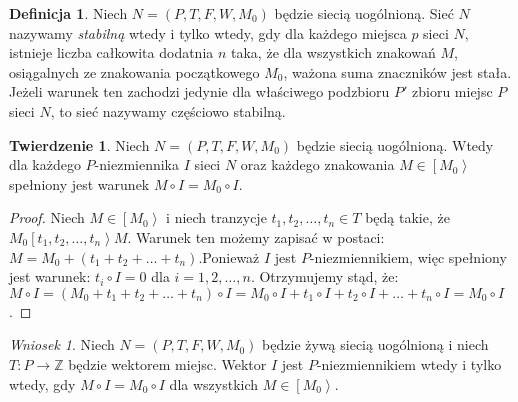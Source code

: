 \documentclass[a4paper,12pt]{book}
\theoremstyle{definition}
\newtheorem{df}{Definicja}
\newtheorem{tw}{Twierdzenie}
\theoremstyle{remark}
\newtheorem{solution}{Wniosek}
\begin{document}
     

\begin{df}
Niech $N=(P,T,F,W,M_0)$ będzie siecią uogólnioną. Sieć $N$ nazywamy \textit{stabilną} wtedy i tylko wtedy, gdy dla każdego miejsca $p$ sieci $N$, istnieje liczba całkowita dodatnia $n$ taka, że dla wszystkich znakowań $M$, osiągalnych ze znakowania początkowego $M_0$, ważona suma znaczników jest stała. Jeżeli warunek ten zachodzi jedynie dla właściwego podzbioru $P'$ zbioru miejsc $P$ sieci $N$, to sieć nazywamy częściowo stabilną.
\end{df}

\begin{tw}
Niech $N=(P,T,F,W,M_0)$ będzie siecią uogólnioną. Wtedy dla każdego $P$-niezmiennika $I$ sieci $N$ oraz każdego znakowania $M \in \left[M_0\right>$ spełniony jest warunek $M \circ I = M_0 \circ I$.  
\end{tw}

\begin{proof}
Niech $M \in \left[M_0\right>$ i niech tranzycje $t_1,t_2,\dots,t_n \in T$ będą takie, że $M_0 \left[t_1,t_2,\dots,t_n\right> M$. Warunek ten możemy zapisać w postaci: $M = M_0 + (t_1+t_2+\dots+t_n)$.Ponieważ $I$ jest $P$-niezmiennikiem, więc spełniony jest warunek: $t_i \circ I = 0$ dla $i = 1,2,\dots,n$. Otrzymujemy stąd, że: $M \circ I = (M_0 + t_1+t_2+\dots+t_n) \circ I = M_0 \circ I + t_1 \circ I + t_2 \circ I + \dots + t_n \circ I = M_0 \circ I$.
\end{proof}

\begin{solution}
Niech $N=(P,T,F,W,M_0)$ będzie żywą siecią uogólnioną i niech $T \colon P \to \mathbb{Z}$ będzie wektorem miejsc. Wektor $I$ jest $P$-niezmiennikiem wtedy i tylko wtedy, gdy $M \circ I = M_0 \circ I$ dla wszystkich $M \in \left[M_0\right>$.
\end{solution}
\end{document}
